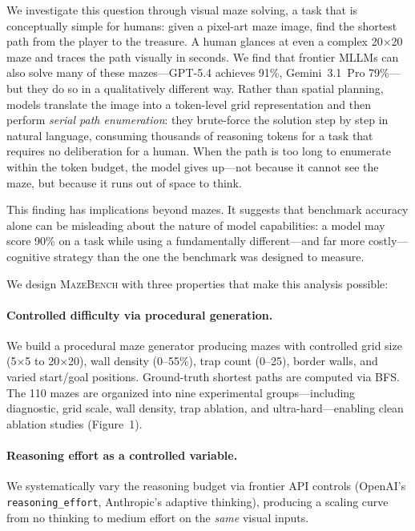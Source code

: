 \documentclass[11pt]{article}
\begin{document}
We investigate this question through visual maze solving, a task that is conceptually simple for humans: given a pixel-art maze image, find the shortest path from the player to the treasure.
A human glances at even a complex 20$\times$20 maze and traces the path visually in seconds.
We find that frontier MLLMs can also solve many of these mazes---GPT-5.4 achieves 91\%, Gemini~3.1~Pro 79\%---but they do so in a qualitatively different way.
Rather than spatial planning, models translate the image into a token-level grid representation and then perform \emph{serial path enumeration}: they brute-force the solution step by step in natural language, consuming thousands of reasoning tokens for a task that requires no deliberation for a human.
When the path is too long to enumerate within the token budget, the model gives up---not because it cannot see the maze, but because it runs out of space to think.

This finding has implications beyond mazes.
It suggests that benchmark accuracy alone can be misleading about the nature of model capabilities: a model may score 90\% on a task while using a fundamentally different---and far more costly---cognitive strategy than the one the benchmark was designed to measure.

We design \textsc{MazeBench} with three properties that make this analysis possible:

\paragraph{Controlled difficulty via procedural generation.}
We build a procedural maze generator producing mazes with controlled grid size (5$\times$5 to 20$\times$20), wall density (0--55\%), trap count (0--25), border walls, and varied start/goal positions.
Ground-truth shortest paths are computed via BFS.
The 110 mazes are organized into nine experimental groups---including diagnostic, grid scale, wall density, trap ablation, and ultra-hard---enabling clean ablation studies (Figure~1).

\paragraph{Reasoning effort as a controlled variable.}
We systematically vary the reasoning budget via frontier API controls (OpenAI's \texttt{reasoning\_effort}, Anthropic's adaptive thinking), producing a scaling curve from no thinking to medium effort on the \emph{same} visual inputs.
\end{document}
